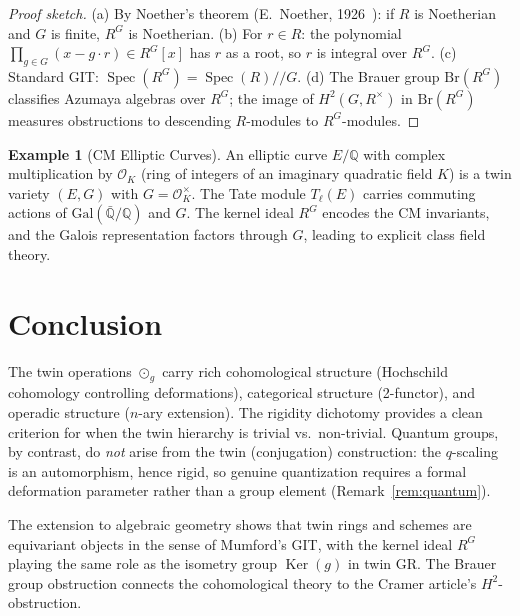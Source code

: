\documentclass[11pt,twocolumn]{article}
\theoremstyle{plain}\newtheorem{theorem}{Theorem}\newtheorem{proposition}[theorem]{Proposition}\newtheorem{corollary}[theorem]{Corollary}\newtheorem{lemma}[theorem]{Lemma}
\theoremstyle{definition}\newtheorem{definition}[theorem]{Definition}\newtheorem{example}[theorem]{Example}
\theoremstyle{remark}\newtheorem{remark}[theorem]{Remark}
\newcommand{\Ker}{\operatorname{Ker}}
\newcommand{\Spec}{\operatorname{Spec}}
\begin{document}
\begin{proof}[Proof sketch]
(a) By Noether's theorem (E.\ Noether, 1926~\cite{noether1926}): if $R$ is Noetherian and $G$ is finite, $R^G$ is Noetherian.
(b) For $r \in R$: the polynomial $\prod_{g \in G}(x - g \cdot r) \in R^G[x]$ has $r$ as a root, so $r$ is integral over $R^G$.
(c) Standard GIT: $\Spec(R^G) = \Spec(R)/\!/G$.
(d) The Brauer group $\mathrm{Br}(R^G)$ classifies Azumaya algebras over $R^G$; the image of $H^2(G, R^\times)$ in $\mathrm{Br}(R^G)$ measures obstructions to descending $R$-modules to $R^G$-modules.
\end{proof}

\begin{example}[CM Elliptic Curves]
An elliptic curve $E/\mathbb{Q}$ with complex multiplication by $\mathcal{O}_K$ (ring of integers of an imaginary quadratic field $K$) is a twin variety $(E, G)$ with $G = \mathcal{O}_K^\times$. The Tate module $T_\ell(E)$ carries commuting actions of $\mathrm{Gal}(\bar{\mathbb{Q}}/\mathbb{Q})$ and $G$. The kernel ideal $R^G$ encodes the CM invariants, and the Galois representation factors through $G$, leading to explicit class field theory.
\end{example}


\section{Conclusion}
\label{sec:conclusion}

The twin operations $\odot_g$ carry rich cohomological structure (Hochschild cohomology controlling deformations), categorical structure (2-functor), and operadic structure ($n$-ary extension). The rigidity dichotomy provides a clean criterion for when the twin hierarchy is trivial vs.\ non-trivial. Quantum groups, by contrast, do \emph{not} arise from the twin (conjugation) construction: the $q$-scaling is an automorphism, hence rigid, so genuine quantization requires a formal deformation parameter rather than a group element (Remark~\ref{rem:quantum}).

The extension to algebraic geometry shows that twin rings and schemes are equivariant objects in the sense of Mumford's GIT, with the kernel ideal $R^G$ playing the same role as the isometry group $\Ker(g)$ in twin GR. The Brauer group obstruction connects the cohomological theory to the Cramer article's $H^2$-obstruction.
\end{document}
